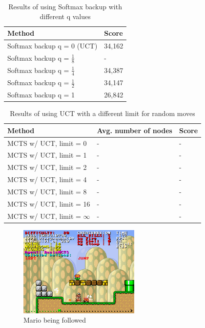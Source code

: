 \documentclass[10pt,a4paper]{article}
\begin{document}
\begin{table}[h]
	\centering
\begin{tabular}{| l | l |}
	\hline
	\textbf{Method} & \textbf{Score} \\ \hline
	Softmax backup q = 0 (UCT) & 34,162 \\ \hline
	Softmax backup q = $\frac{1}{8}$ & - \\ \hline
	Softmax backup q = $\frac{1}{4}$ & 34,387 \\ \hline
	Softmax backup q = $\frac{1}{2}$ & 34,147 \\ \hline
	Softmax backup q = 1 & 26,842 \\ \hline
\end{tabular}
	\caption{Results of using Softmax backup with different q values}
	\label{tab:softmax_results}
\end{table}

\begin{table}[h]
	\centering
\begin{tabular}{| l | l | l |}
	\hline
	\textbf{Method} & \textbf{Avg. number of nodes} & \textbf{Score} \\ \hline
	MCTS w/ UCT, limit = 0			& - & - \\ \hline
	MCTS w/ UCT, limit = 1			& - & - \\ \hline
	MCTS w/ UCT, limit = 2			& - & - \\ \hline
	MCTS w/ UCT, limit = 4			& - & - \\ \hline
	MCTS w/ UCT, limit = 8			& - & - \\ \hline
	MCTS w/ UCT, limit = 16			& - & - \\ \hline
	MCTS w/ UCT, limit = $\infty$	& - & - \\ \hline
\end{tabular}
	\caption{Results of using UCT with a different limit for random moves}
	\label{tab:uct_results}
\end{table}

\begin{figure}[h]
\centering
\includegraphics[width=6cm]{img/Forfulgt}
\caption{Mario being followed}
\label{fig:followed}
\end{figure}
\end{document}
